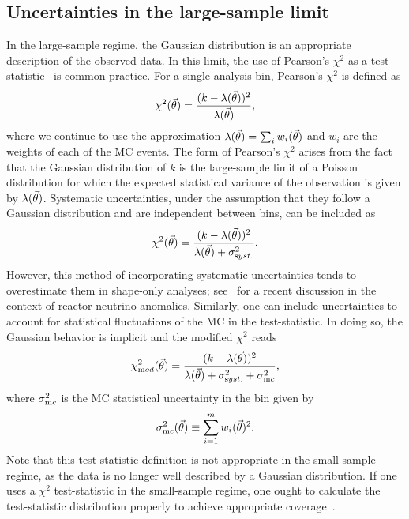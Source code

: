 \subsection{Uncertainties in the large-sample limit}
In the large-sample regime, the Gaussian distribution is an appropriate description of the observed data. In this limit, the use of Pearson's $\chi^2$ as a test-statistic~\cite{Pearson:1900} is common practice. For a single analysis bin, Pearson's $\chi^2$ is defined as
\begin{equation}
\chi^2(\vec{\theta}) = \frac{(k - \lambda(\vec{\theta}))^2}{\lambda(\vec{\theta})},
\label{eq:chi2_pearson}
\end{equation}
where we continue to use the approximation $\lambda(\vec{\theta}) = \sum_i{w_i(\vec{\theta})}$ and $w_i$ are the weights of each of the MC events. The form of Pearson's $\chi^2$ arises from the fact that the Gaussian distribution of $k$ is the large-sample limit of a Poisson distribution for which the expected statistical variance of the observation is given by $\lambda(\vec{\theta})$. Systematic uncertainties, under the assumption that they follow a Gaussian distribution and are independent between bins, can be included as
\begin{equation}
\chi^2(\vec{\theta}) = \frac{(k - \lambda(\vec{\theta}))^2}{\lambda(\vec{\theta}) + \sigma^2_{\textrm syst.}}.
\label{eq:chi2_systematics}
\end{equation}
However, this method of incorporating systematic uncertainties tends to overestimate them in shape-only analyses; see~\cite{Cogswell:2018auu} for a recent discussion in the context of reactor neutrino anomalies. Similarly, one can include uncertainties to account for statistical fluctuations of the MC in the test-statistic. In doing so, the Gaussian behavior is implicit and the modified $\chi^2$ reads
\begin{align}
\chi^2_{\textrm mod}(\vec{\theta}) = \frac{(k - \lambda(\vec{\theta}))^2}{\lambda(\vec{\theta}) + \sigma^2_{\textrm syst.} + \sigma^2_{\textrm mc}},
\label{eq:modified_chi2}
\end{align}
where $\sigma^2_{\textrm mc}$ is the MC statistical uncertainty in the bin given by
\begin{equation}\label{eq:sigma}
\sigma^2_{\textrm mc}(\vec{\theta}) \equiv \sum_{i=1}^m w_i(\vec{\theta})^2.
\end{equation}
Note that this test-statistic definition is not appropriate in the small-sample regime, as the data is no longer well described by a Gaussian distribution. If one uses a $\chi^2$ test-statistic in the small-sample regime, one ought to calculate the test-statistic distribution properly to achieve appropriate coverage~\cite{cowan1998statistical}.

